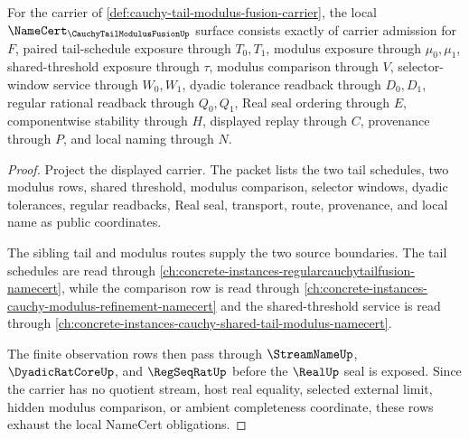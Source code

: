 \begin{theorem}
\label{thm:cauchy-tail-modulus-fusion-namecert-obligations}
For the carrier of \autoref{def:cauchy-tail-modulus-fusion-carrier}, the local $\NameCert_{\CauchyTailModulusFusionUp}$ surface consists exactly of carrier admission for $F$, paired tail-schedule exposure through $T_0,T_1$, modulus exposure through $\mu_0,\mu_1$, shared-threshold exposure through $\tau$, modulus comparison through $V$, selector-window service through $W_0,W_1$, dyadic tolerance readback through $D_0,D_1$, regular rational readback through $Q_0,Q_1$, Real seal ordering through $E$, componentwise stability through $H$, displayed replay through $C$, provenance through $P$, and local naming through $N$.
\end{theorem}
\begin{proof}
Project the displayed carrier. The packet lists the two tail schedules, two modulus rows, shared threshold, modulus comparison, selector windows, dyadic tolerances, regular readbacks, Real seal, transport, route, provenance, and local name as public coordinates.

The sibling tail and modulus routes supply the two source boundaries. The tail schedules are read through \autoref{ch:concrete-instances-regularcauchytailfusion-namecert}, while the comparison row is read through \autoref{ch:concrete-instances-cauchy-modulus-refinement-namecert} and the shared-threshold service is read through \autoref{ch:concrete-instances-cauchy-shared-tail-modulus-namecert}.

The finite observation rows then pass through $\StreamNameUp$, $\DyadicRatCoreUp$, and $\RegSeqRatUp$ before the $\RealUp$ seal is exposed. Since the carrier has no quotient stream, host real equality, selected external limit, hidden modulus comparison, or ambient completeness coordinate, these rows exhaust the local NameCert obligations.
\end{proof}


